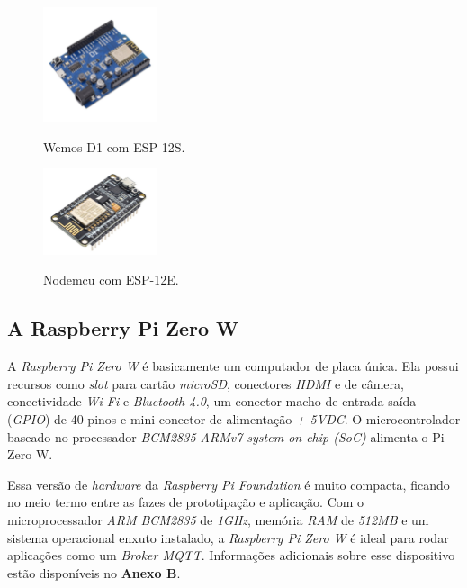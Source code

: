 \begin{figure}[H]
	\centering
	\caption{Wemos D1 com ESP-12S.}
	\includegraphics[width=0.3\textwidth]{figuras/ESP-12S-wemos.png}
	\label{fig:esp12s-wemos}
\end{figure}

\begin{figure}[H]
	\centering
	\caption{Nodemcu com ESP-12E.}
	\includegraphics[width=0.3\textwidth]{figuras/ESP-12E-nodemcu.png}
	\label{fig:esp12s-nodemcu}
\end{figure}

\subsection{A Raspberry Pi Zero W}

A \textit{Raspberry Pi Zero W} é basicamente um computador de placa única. Ela possui recursos como \textit{slot} para cartão \textit{microSD}, conectores \textit{HDMI} e de câmera, conectividade \textit{Wi-Fi} e \textit{Bluetooth 4.0}, um conector macho de entrada-saída (\textit{GPIO}) de 40 pinos e mini conector de alimentação \textit{+ 5VDC}. O microcontrolador baseado no processador \textit{BCM2835 ARMv7 system-on-chip (SoC)} alimenta o Pi Zero W.

Essa versão de \textit{hardware} da \textit{Raspberry Pi Foundation} é muito compacta, ficando no meio termo entre as fazes de prototipação e aplicação. Com o microprocessador \textit{ARM BCM2835} de \textit{1GHz}, memória \textit{RAM} de \textit{512MB} e um sistema operacional enxuto instalado, a \textit{Raspberry Pi Zero W} é ideal para rodar aplicações como um \textit{Broker MQTT}. Informações adicionais sobre esse dispositivo estão disponíveis no \textbf{Anexo B}.

